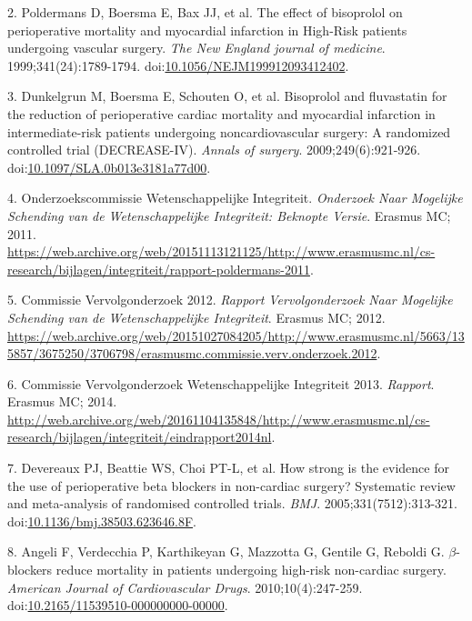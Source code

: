 \documentclass[]{article}
\begin{document}
\hypertarget{ref-poldermans1999}{}
2. Poldermans D, Boersma E, Bax JJ, et al. The effect of bisoprolol on
perioperative mortality and myocardial infarction in High-Risk patients
undergoing vascular surgery. \emph{The New England journal of medicine}.
1999;341(24):1789-1794.
doi:\href{https://doi.org/10.1056/NEJM199912093412402}{10.1056/NEJM199912093412402}.

\hypertarget{ref-dunkelgrun2009}{}
3. Dunkelgrun M, Boersma E, Schouten O, et al. Bisoprolol and
fluvastatin for the reduction of perioperative cardiac mortality and
myocardial infarction in intermediate-risk patients undergoing
noncardiovascular surgery: A randomized controlled trial (DECREASE-IV).
\emph{Annals of surgery}. 2009;249(6):921-926.
doi:\href{https://doi.org/10.1097/SLA.0b013e3181a77d00}{10.1097/SLA.0b013e3181a77d00}.

\hypertarget{ref-commissie2011}{}
4. Onderzoekscommissie Wetenschappelijke Integriteit. \emph{Onderzoek
Naar Mogelijke Schending van de Wetenschappelijke Integriteit: Beknopte
Versie}. Erasmus MC; 2011.
\url{https://web.archive.org/web/20151113121125/http://www.erasmusmc.nl/cs-research/bijlagen/integriteit/rapport-poldermans-2011}.

\hypertarget{ref-commissie2012}{}
5. Commissie Vervolgonderzoek 2012. \emph{Rapport Vervolgonderzoek Naar
Mogelijke Schending van de Wetenschappelijke Integriteit}. Erasmus MC;
2012.
\url{https://web.archive.org/web/20151027084205/http://www.erasmusmc.nl/5663/135857/3675250/3706798/erasmusmc.commissie.verv.onderzoek.2012}.

\hypertarget{ref-commissie2013}{}
6. Commissie Vervolgonderzoek Wetenschappelijke Integriteit 2013.
\emph{Rapport}. Erasmus MC; 2014.
\url{http://web.archive.org/web/20161104135848/http://www.erasmusmc.nl/cs-research/bijlagen/integriteit/eindrapport2014nl}.

\hypertarget{ref-Devereaux313}{}
7. Devereaux PJ, Beattie WS, Choi PT-L, et al. How strong is the
evidence for the use of perioperative beta blockers in non-cardiac
surgery? Systematic review and meta-analysis of randomised controlled
trials. \emph{BMJ}. 2005;331(7512):313-321.
doi:\href{https://doi.org/10.1136/bmj.38503.623646.8F}{10.1136/bmj.38503.623646.8F}.

\hypertarget{ref-Angeli2010}{}
8. Angeli F, Verdecchia P, Karthikeyan G, Mazzotta G, Gentile G, Reboldi
G. \(\beta\)-blockers reduce mortality in patients undergoing high-risk
non-cardiac surgery. \emph{American Journal of Cardiovascular Drugs}.
2010;10(4):247-259.
doi:\href{https://doi.org/10.2165/11539510-000000000-00000}{10.2165/11539510-000000000-00000}.
\end{document}
